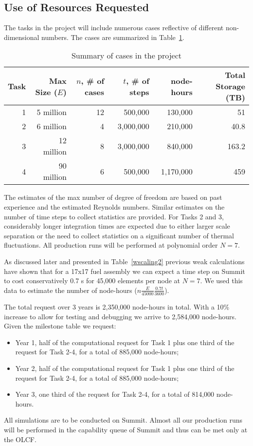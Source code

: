 \vspace{-.25in}
\subsection{Use of Resources Requested}
\vspace{-.2in}

The tasks in the project will include numerous cases reflective of different
non-dimensional numbers. The cases are summarized in Table~\ref{tab:cases}.

\begin{table}
\centering
\caption{Summary of cases in the project}
\begin{tabular}{rrrrrr}
\hline
\hline
Task & Max Size ($E$) &  $n$, \# of cases  & $t$, \# of steps & node-hours & Total Storage (TB)\\
\hline
\hline
1 & 5 million       & 12   & 500,000   &    130,000 & 51\\
2 & 6 million       & 4    & 3,000,000 &    210,000 & 40.8\\
3 & 12 million      & 8    & 3,000,000 &    840,000 & 163.2\\
4 & ~90 million  & 6    & 500,000   &  1,170,000 & 459\\
\hline
\hline
\end{tabular}
\label{tab:cases}
\end{table}

The estimates of the max number of degree of freedom are based  on past
experience and the estimated Reynolds numbers. Similar estimates on the number
of time steps to collect statistics are provided. For Tasks 2 and 3,
considerably longer integration times are expected due to either larger scale
separation or the need to collect statistics on a significant number of thermal
fluctuations. All production runs will be performed at polynomial order $N=7$.

As discussed later and presented in Table~\ref{wscaling2} previous weak
calculations have shown that for a 17x17 fuel assembly we can expect a time
step on Summit to cost conservatively 0.7 s for 45,000 elements per node at $N=7$. We
used this data to estimate the number of node-hours
($n\frac{E}{45000}\frac{0.7t}{3600}$).

The total request over 3 years is 2,350,000 node-hours in total. With a 10\% increase to allow for testing and debugging we arrive to 2,584,000 node-hours. Given the milestone table we request:
\begin{itemize}
    \item Year 1, half of the computational request for Task 1 plus one third of the request for Task 2-4, for a total of 885,000 node-hours;
    \item Year 2, half of the computational request for Task 1 plus one third of the request for Task 2-4, for a total of 885,000 node-hours;
    \item Year 3, one third of the request for Task 2-4, for a total of 814,000 node-hours.
\end{itemize}
All simulations are to be conducted on Summit. Almost all our production runs will be performed in the capability queue of Summit and thus can be met only at the OLCF.

